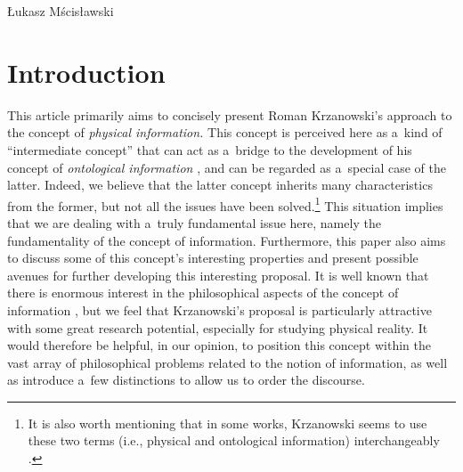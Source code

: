 \begin{artengenv}{Łukasz Mścisławski}
\section{Introduction}
This article primarily aims to concisely present Roman Krzanowski's approach to the concept of \textit{physical information.} This concept is perceived here as a~kind of ``intermediate concept'' that can act as a~bridge to the development of his concept of \textit{ontological information}
\parencites[cf.][]{krzanowski_does_2020}[][]{krzanowski_what_2020}[][]{krzanowski_why_2020}[and especially][]{krzanowski_ontological_2022},%
and can be regarded as a~special case of the latter. Indeed, we believe that the latter concept inherits many characteristics from the former, but not all the issues have been solved.\footnote{It is also worth mentioning that in some works, Krzanowski seems to use these two terms (i.e., physical and ontological information) interchangeably
\parencite[cf.][]{krzanowski_what_2020}.%
} This situation implies that we are dealing with a~truly fundamental issue here, namely the fundamentality of the concept of information. Furthermore, this paper also aims to discuss some of this concept's interesting properties and present possible avenues for further developing this interesting proposal. It is well known that there is enormous interest in the philosophical aspects of the concept of information 
\parencites[e.g.,][]{adriaans_philosophy_2008}[][]{burgin_theory_2010}[][]{floridi_philosophy_2011}[][]{dodig_crnkovic_philosophy_2019}, %
 but we feel that Krzanowski's proposal is particularly attractive with some great research potential, especially for studying physical reality. It would %
therefore be helpful, in our opinion, to position this concept within the vast array of philosophical problems related to the notion of information, as well as introduce a~few distinctions to allow us to order the discourse.


\end{artengenv}

